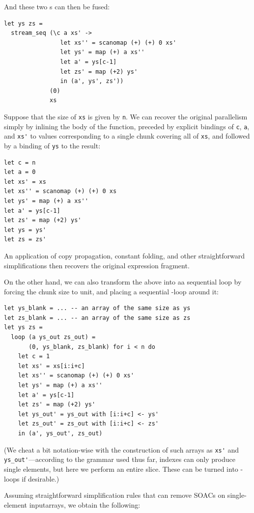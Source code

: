 And these two \StreamSeq{}s can then be fused:

\begin{lstlisting}
let ys zs =
  stream_seq (\c a xs' ->
                let xs'' = scanomap (+) (+) 0 xs'
                let ys' = map (+) a xs''
                let a' = ys[c-1]
                let zs' = map (+2) ys'
                in (a', ys', zs'))
             (0)
             xs
\end{lstlisting}

Suppose that the size of \lstinline{xs} is given by \lstinline{n}.  We
can recover the original parallelism simply by inlining the body of
the function, preceded by explicit bindings of \lstinline{c},
\lstinline{a}, and \lstinline{xs'} to values corresponding to a single
chunk covering all of \lstinline{xs}, and followed by a binding of
\lstinline{ys} to the result:

\begin{lstlisting}
let c = n
let a = 0
let xs' = xs
let xs'' = scanomap (+) (+) 0 xs
let ys' = map (+) a xs''
let a' = ys[c-1]
let zs' = map (+2) ys'
let ys = ys'
let zs = zs'
\end{lstlisting}

An application of copy propagation, constant folding, and other
straightforward simplifications then recovers the original expression
fragment.

On the other hand, we can also transform the above \StreamSeq into aa
sequential loop by forcing the chunk size to unit, and placing a
sequential -loop around it:

\begin{lstlisting}
let ys_blank = ... -- an array of the same size as ys
let zs_blank = ... -- an array of the same size as zs
let ys zs =
  loop (a ys_out zs_out) =
       (0, ys_blank, zs_blank) for i < n do
    let c = 1
    let xs' = xs[i:i+c]
    let xs'' = scanomap (+) (+) 0 xs'
    let ys' = map (+) a xs''
    let a' = ys[c-1]
    let zs' = map (+2) ys'
    let ys_out' = ys_out with [i:i+c] <- ys'
    let zs_out' = zs_out with [i:i+c] <- zs'
    in (a', ys_out', zs_out)
\end{lstlisting}

(We cheat a bit notation-wise with the construction of such arrays as
\lstinline{xs'} and \lstinline{ys_out'}---according to the grammar
used thus far, indexes can only produce single elements, but here we
perform an entire slice.  These can be turned into -loops if
desirable.)

Assuming straightforward simplification rules that can remove SOACs on
single-element inputarrays, we obtain the following:

